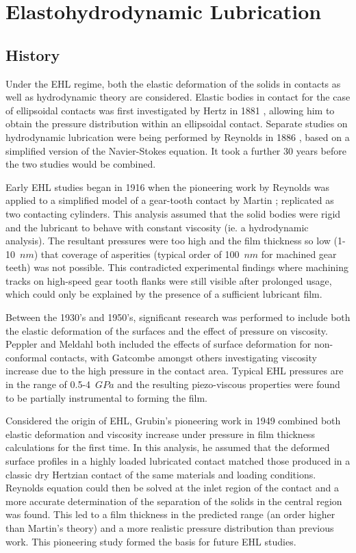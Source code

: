 \section{Elastohydrodynamic Lubrication}

\subsection{History}

Under the EHL regime, both the elastic deformation of the solids in contacts as well as hydrodynamic theory are considered. Elastic bodies in contact for the case of ellipsoidal contacts was first investigated by Hertz in 1881 \cite{Hertz1881}, allowing him to obtain the pressure distribution within an ellipsoidal contact. Separate studies on hydrodynamic lubrication were being performed by Reynolds in 1886 \cite{Reynolds1886}, based on a simplified version of the Navier-Stokes equation. It took a further 30 years before the two studies would be combined.

Early EHL studies began in 1916 when the pioneering work by Reynolds was applied to a simplified model of a gear-tooth contact by Martin \cite{Martin1916}; replicated as two contacting cylinders. This analysis assumed that the solid bodies were rigid and the lubricant to behave with constant viscosity (ie. a hydrodynamic analysis). The resultant pressures were too high and the film thickness so low (1-10~$nm$) that coverage of asperities (typical order of 100~$nm$ for machined gear teeth) was not possible. This contradicted experimental findings where machining tracks on high-speed gear tooth flanks were still visible after prolonged usage, which could only be explained by the presence of a sufficient lubricant film.

Between the 1930’s and 1950’s, significant research was performed to include both the elastic deformation of the surfaces and the effect of pressure on viscosity. Peppler \cite{Peppler1936} and Meldahl \cite{Meldahl1941} both included the effects of surface deformation for non-conformal contacts, with Gatcombe \cite{Gatcombe1945} amongst others investigating viscosity increase due to the high pressure in the contact area. Typical EHL pressures are in the range of 0.5-4~$GPa$ and the resulting piezo-viscous properties were found to be partially instrumental to forming the film.

Considered the origin of EHL, Grubin’s pioneering work in 1949 \cite{Grubin1949} combined both elastic deformation and viscosity increase under pressure in film thickness calculations for the first time. In this analysis, he assumed that the deformed surface profiles in a highly loaded lubricated contact matched those produced in a classic dry Hertzian contact of the same materials and loading conditions. Reynolds equation could then be solved at the inlet region of the contact and a more accurate determination of the separation of the solids in the central region was found. This led to a film thickness in the predicted range (an order higher than Martin’s theory) and a more realistic pressure distribution than previous work. This pioneering study formed the basis for future EHL studies.


